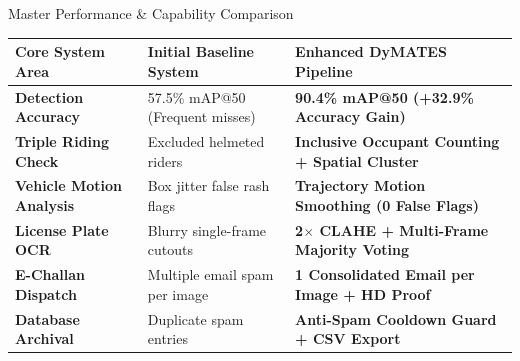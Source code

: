 \documentclass[10pt, compress, aspectratio=169]{beamer}
\begin{document}
\begin{frame}{Master Performance \& Capability Comparison}
    \begin{center}
        \small
        \renewcommand{\arraystretch}{1.42}
        \begin{tabularx}{0.98\textwidth}{lXX}
            \rowcolor{BTPPrimary!15}
            \textbf{Core System Area} & \textbf{Initial Baseline System} & \textbf{Enhanced DyMATES Pipeline} \\
            \hline
            \rowcolor{BTPBg}
            \textbf{Detection Accuracy} & 57.5\% mAP@50 (Frequent misses) & \textbf{\textcolor{BTPGreen}{90.4\% mAP@50 (+32.9\% Accuracy Gain)}} \\
            \textbf{Triple Riding Check} & Excluded helmeted riders & \textbf{\textcolor{BTPGreen}{Inclusive Occupant Counting + Spatial Cluster}} \\
            \rowcolor{BTPBg}
            \textbf{Vehicle Motion Analysis} & Box jitter false rash flags & \textbf{\textcolor{BTPGreen}{Trajectory Motion Smoothing (0 False Flags)}} \\
            \textbf{License Plate OCR} & Blurry single-frame cutouts & \textbf{\textcolor{BTPGreen}{2$\times$ CLAHE + Multi-Frame Majority Voting}} \\
            \rowcolor{BTPBg}
            \textbf{E-Challan Dispatch} & Multiple email spam per image & \textbf{\textcolor{BTPGreen}{1 Consolidated Email per Image + HD Proof}} \\
            \textbf{Database Archival} & Duplicate spam entries & \textbf{\textcolor{BTPGreen}{Anti-Spam Cooldown Guard + CSV Export}} \\
            \hline
        \end{tabularx}
    \end{center}

    \vspace{2.5mm}
    \begin{center}
    \end{center}
\end{frame}
\end{document}

